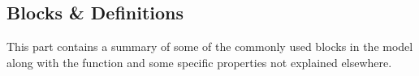 \subsection{Blocks \& Definitions}

This part contains a summary of some of the commonly used blocks in the model along with the function and some specific properties not explained elsewhere.

 
